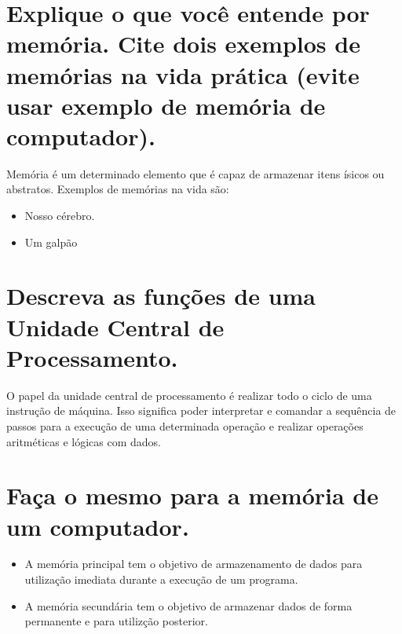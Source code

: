 \documentclass[
	12pt,				%
	openright,			%
	twoside,			%
	a4paper,			%
	english,			%
	french,				%
	spanish,			%
	brazil,				%
	]{abntex2}
\begin{document}

\frenchspacing


\imprimircapa

\imprimirfolhaderosto

\tableofcontents*
\cleardoublepage

\section{Explique o que você entende por memória. Cite dois exemplos de memórias na vida prática (evite usar exemplo de memória de computador).}
\label{sec:org3c73860}
Memória é um determinado elemento que é capaz de armazenar itens ísicos ou
abstratos. Exemplos de memórias na vida são:
\begin{itemize}
\item Nosso cérebro.
\item Um galpão
\end{itemize}
\section{Descreva as funções de uma Unidade Central de Processamento.}
\label{sec:org4b3b1fc}
O papel da unidade central de processamento é realizar todo o ciclo de uma
instrução de máquina. Isso significa poder interpretar e comandar a sequência de
passos para a execução de uma determinada operação e realizar operações
aritméticas e lógicas com dados.
\section{Faça o mesmo para a memória de um computador.}
\label{sec:orgb0fdd6d}
\begin{itemize}
\item A memória principal tem o objetivo de armazenamento de dados para utilização
imediata durante a execução de um programa.
\item A memória secundária tem o objetivo de armazenar dados de forma permanente e
para utilizção posterior.
\end{itemize}
\end{document}
